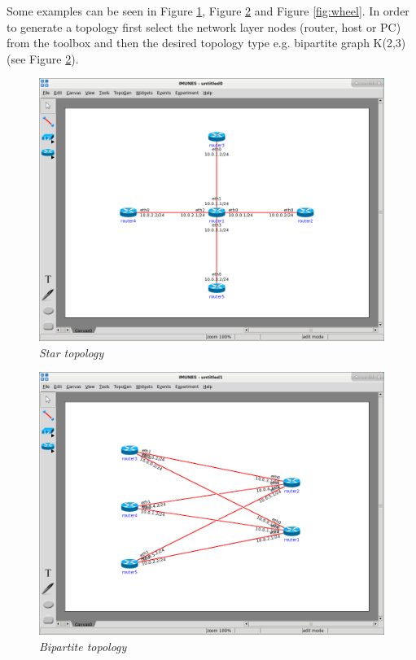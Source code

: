 Some examples can be seen in Figure \ref{fig:star}, Figure \ref{fig:bipartite}
and Figure \ref{fig:wheel}. In order to generate a topology first select the
network layer nodes (router, host or PC) from the toolbox and then the desired
topology type e.g. bipartite graph K(2,3) (see Figure \ref{fig:bipartite}).

\begin{figure}[H]
\centering
\vspace{10pt}
\includegraphics[width=\textwidth]{./images/star.png}
\caption{\emph{Star topology}}
\label{fig:star}
\end{figure}

\begin{figure}[H]
\centering
\includegraphics[width=\textwidth]{./images/bipartite.png}
\caption{\emph{Bipartite topology}}
\label{fig:bipartite}
\end{figure}

